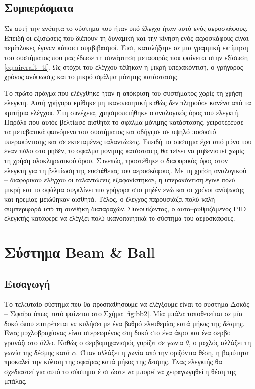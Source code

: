 \subsection{Συμπεράσματα}

Σε αυτή την ενότητα το σύστημα που ήταν υπό έλεγχο ήταν αυτό ενός αεροσκάφους. Επειδή οι εξισώσεις που διέπουν τη δυναμική και την κίνηση ενός αεροσκάφους είναι περίπλοκες έγιναν κάποιοι συμβιβασμοί. Έτσι, καταλήξαμε σε μια γραμμική εκτίμηση του συστήματος που μας έδωσε τη συνάρτηση μεταφοράς που φαίνεται στην εξίσωση \ref{eq:aircraft_tf}. Ως στόχοι του ελέγχου τέθηκαν η μικρή υπερακόντιση, ο γρήγορος χρόνος ανύψωσης και το μικρό σφάλμα μόνιμης κατάστασης.

Το πρώτο πράγμα που ελέγχθηκε ήταν η απόκριση του συστήματος χωρίς τη χρήση ελεγκτή. Αυτή γρήγορα κρίθηκε μη ικανοποιητική καθώς δεν πληρούσε κανένα από τα κριτήρια ελέγχου. Στη συνέχεια, χρησιμοποιήθηκε ο αναλογικός όρος του ελεγκτή. Παρόλο που αυτός βελτίωσε αισθητά το σφάλμα μόνιμης κατάστασης, χειροτέρευσε τα μεταβατικά φαινόμενα του συστήματος και οδήγησε σε υψηλό ποσοστό υπερακόντισης και σε εκτεταμένες ταλαντώσεις. Επειδή το σύστημα έχει από μόνο του έναν πόλο στο μηδέν, το σφάλμα μόνιμης κατάστασης θα τείνει να μηδενιστεί χωρίς τη χρήση ολοκληρωτικού όρου. Συνεπώς, προστέθηκε ο διαφορικός όρος στον ελεγκτή για τη βελτίωση της ευστάθειας του αεροσκάφους. Με τη χρήση αναλογικού -- διαφορικού ελέγχου οι ταλαντώσεις εξαφανίστηκαν, η υπερακόντιση έγινε πολύ μικρή και το σφάλμα συγκλίνει πιο γρήγορα στο μηδέν ενώ και οι χρόνοι ανύψωσης και ηρεμίας μειώθηκαν αισθητά. Τέλος, ο έλεγχος παρουσιάζει πολύ καλή συμπεριφορά υπό τη συνθήκη διαταραχών. Συνοψίζοντας, ο αυτο--ρυθμιζόμενος PID ελεγκτής κατάφερε να ελέγξει πολύ ικανοποιητικά το σύστημα του αεροσκάφους.\newpage

\section{Σύστημα Beam \& Ball} \label{sec:ball_beam}

\subsection{Εισαγωγή}

Το τελευταίο σύστημα που θα προσπαθήσουμε να ελέγξουμε είναι το σύστημα Δοκός -- Σφαίρα όπως αυτό φαίνεται στο Σχήμα \ref{fig:bb2}. Μία μπάλα τοποθετείται σε μία δοκό όπου επιτρέπεται να κυλήσει με ένα βαθμό ελευθερίας κατά μήκος της δέσμης. Ένας μοχλοβραχίονας είναι στερεωμένος στη δοκό στο ένα άκρο και ένα σερβο γρανάζι στο άλλο. Καθώς ο σερβομηχανισμός γυρίζει σε γωνία $\theta$, ο μοχλός αλλάζει τη γωνία της δέσμης κατά $\alpha$. Όταν αλλάζει η γωνία από την οριζόντια θέση, η βαρύτητα προκαλεί την κύλιση της σφαίρας κατά μήκος της δέσμης. Ένας ελεγκτής θα σχεδιαστεί για αυτό το σύστημα έτσι ώστε να μπορεί να χειραγωγηθεί η θέση της μπάλας.

